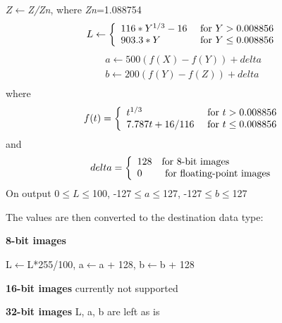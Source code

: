 \documentclass{article}
\begin{document}
$Z\leftarrow $\textit{Z/Zn}, where \textit{Zn}=1.088754
\[
L\leftarrow \left\{ {{\begin{array}{*{20}c}
 {116\ast Y^{1/3}-16} \hfill & {\mbox{ for }Y>0.008856} \hfill \\
 {903.3\ast Y} \hfill & {\mbox{ for }Y\le 0.008856} \hfill \\
\end{array} }} \right.
\]
\[
\begin{array}{l}
 a\leftarrow 500(f(X)-f(Y))+delta \\
 b\leftarrow 200(f(Y)-f(Z))+delta \\
 \end{array}
\]
where
\[
f(t)=\left\{ {{\begin{array}{*{20}c}
 {t^{1/3}} \hfill & {\mbox{ for }t>0.008856} \hfill \\
 {7.787t+16/116} \hfill & {\mbox{ for }t\le 0.008856} \hfill \\
\end{array} }} \right.
\]
and
\[
delta=\left\{ {{\begin{array}{*{20}c}
 {128} \hfill & {\mbox{for 8-bit images}} \hfill \\
 0 \hfill & {\mbox{ for floating-point images}} \hfill \\
\end{array} }} \right.
\]
On output 0$\le L\le $100, -127$\le a\le $127, -127$\le b\le $127

The values are then converted to the destination data type:

\textbf{8-bit images}

L$\leftarrow $L*255/100, a$\leftarrow $a + 128, b$\leftarrow $b + 128

\textbf{16-bit images }currently not supported

\textbf{32-bit images }L, a, b are left as is
\end{document}
